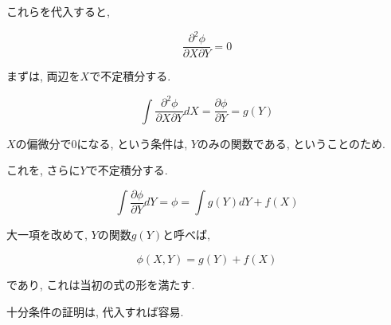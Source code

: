 \documentclass{jsarticle} \usepackage[dvipdfmx]{graphicx} \usepackage[dvipdfmx]{hyperref}
\begin{document}
これらを代入すると, 

\begin{equation}
  \frac{\partial^2 \phi}{\partial X \partial Y} = 0
\end{equation}

まずは, 両辺を$X$で不定積分する. 

\begin{equation}
  \int \frac{\partial^2 \phi}{\partial X \partial Y} dX = \frac{\partial \phi}{\partial Y} = g(Y)
\end{equation}

$X$の偏微分で$0$になる, という条件は, $Y$のみの関数である, ということのため. 

これを, さらに$Y$で不定積分する. 

\begin{equation}
  \int \frac{\partial \phi}{\partial Y} dY = \phi = \int g(Y) dY + f(X)
\end{equation}

大一項を改めて, $Y$の関数$g(Y)$と呼べば, 

\begin{equation}
  \phi(X, Y) = g(Y) + f(X)
\end{equation}

であり, これは当初の式の形を満たす. 

十分条件の証明は, 代入すれば容易. 
\end{document}
